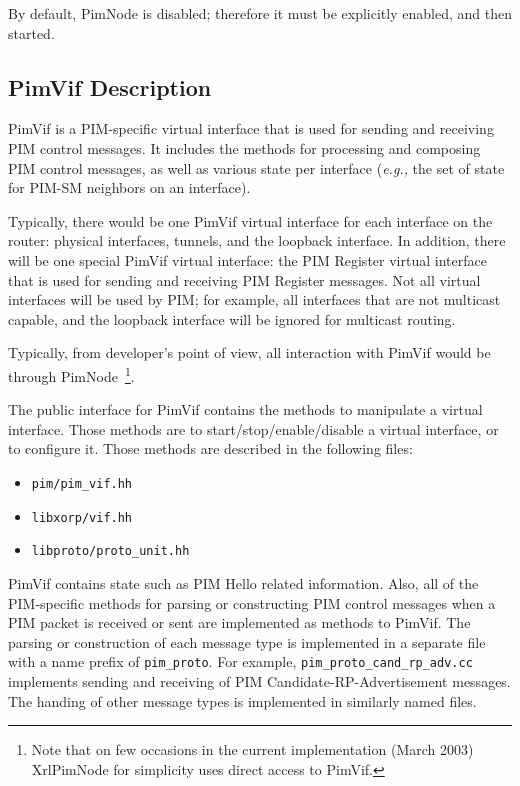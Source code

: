 \documentclass[11pt]{article}
\newcommand{\eg}{\emph{e.g.,}\xspace}
\begin{document}
By default, PimNode is disabled; therefore it must be explicitly
enabled, and then started.

\subsection{PimVif Description}

PimVif is a PIM-specific virtual interface that is used for sending and
receiving PIM control messages. It includes the methods for processing
and composing PIM control messages, as well as various state per
interface (\eg the set of state for PIM-SM neighbors on an interface).

Typically, there would be one PimVif virtual interface for each
interface on the router: physical interfaces, tunnels, and the loopback
interface. In addition, there will be one special PimVif virtual
interface: the PIM Register virtual interface that is used for sending
and receiving PIM Register messages. Not all virtual interfaces will be
used by PIM; for example, all interfaces that are not multicast
capable, and the loopback interface will be ignored for multicast
routing.

Typically, from developer's point of view, all interaction with PimVif
would be through PimNode~\footnote{Note that on few occasions in the current
implementation (March 2003) XrlPimNode for simplicity uses
direct access to PimVif.}.

The public interface for PimVif contains the methods to manipulate a
virtual interface. Those methods are to start/stop/enable/disable a
virtual interface, or to configure it. Those methods are described in
the following files:

\begin{itemize}
  \item \verb=pim/pim_vif.hh=
  \item \verb=libxorp/vif.hh=
  \item \verb=libproto/proto_unit.hh=
\end{itemize}

PimVif contains state such as PIM Hello related information. Also, all
of the PIM-specific methods for parsing or constructing PIM control
messages when a PIM packet is received or sent are implemented as
methods to PimVif. The parsing or construction of each message type is
implemented in a separate file with a name prefix of \verb=pim_proto=.
For example, \verb=pim_proto_cand_rp_adv.cc= implements sending and
receiving of PIM Candidate-RP-Advertisement messages. The handing of
other message types is implemented in similarly named files.
\end{document}
